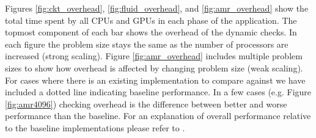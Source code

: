 Figures \ref{fig:ckt_overhead}, \ref{fig:fluid_overhead}, and \ref{fig:amr_overhead} show 
the total time spent by all CPUs and GPUs in each phase of the application.  The topmost
component of each bar shows the overhead of the dynamic checks.  In 
each figure the problem size stays the same as the number of processors are increased
(strong scaling).  Figure \ref{fig:amr_overhead} includes multiple problem sizes to show
how overhead is affected by changing problem size (weak scaling).  For cases where there
is an existing implementation to compare against we have included a dotted line indicating
baseline performance.  In a few cases (e.g. Figure \ref{fig:amr4096}) checking overhead is the difference
between better and worse performance than the baseline.  For an explanation of overall
performance relative to the baseline implementations please refer to \cite{Legion12}.

